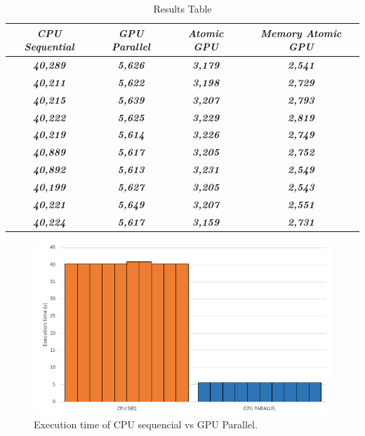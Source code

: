 \documentclass[conference]{IEEEtran}
\begin{document}
\begin{table}[htbp]
	\caption{Results Table} %
	\begin{adjustbox}{width=\columnwidth,center}
		\begin{tabular}{|c|c|c|c|}
		\hline
			\textbf{\textit{CPU Sequential}} & \textbf{\textit{GPU Parallel}} & \textbf{\textit{Atomic GPU}} & \textbf{\textit{Memory Atomic GPU}} \\ \hline
			\textbf{\textit{40,289}} & \textbf{\textit{5,626}} & \textbf{\textit{3,179}} & \textbf{\textit{2,541}} \\ \hline
			\textbf{\textit{40,211}} & \textbf{\textit{5,622}} & \textbf{\textit{3,198}} & \textbf{\textit{2,729}} \\ \hline
			\textbf{\textit{40,215}} & \textbf{\textit{5,639}} & \textbf{\textit{3,207}} & \textbf{\textit{2,793}} \\ \hline
			\textbf{\textit{40,222}} & \textbf{\textit{5,625}} & \textbf{\textit{3,229}} & \textbf{\textit{2,819}} \\ \hline
			\textbf{\textit{40,219}} & \textbf{\textit{5,614}} & \textbf{\textit{3,226}} & \textbf{\textit{2,749}} \\ \hline
			\textbf{\textit{40,889}} & \textbf{\textit{5,617}} & \textbf{\textit{3,205}} & \textbf{\textit{2,752}} \\ \hline
			\textbf{\textit{40,892}} & \textbf{\textit{5,613}} & \textbf{\textit{3,231}} & \textbf{\textit{2,549}} \\ \hline
			\textbf{\textit{40,199}} & \textbf{\textit{5,627}} & \textbf{\textit{3,205}} & \textbf{\textit{2,543}} \\ \hline
			\textbf{\textit{40,221}} & \textbf{\textit{5,649}} & \textbf{\textit{3,207}} & \textbf{\textit{2,551}} \\ \hline
			\textbf{\textit{40,224}} & \textbf{\textit{5,617}} & \textbf{\textit{3,159}} & \textbf{\textit{2,731}} \\ \hline
	\end{tabular}
	\label{tab2}
	\end{adjustbox}
\end{table}
\newpage
\begin{figure}[htbp]
	\centerline{\includegraphics[width=\linewidth]{figures/graph_cpuVSgpupar.png}}
	\caption{Execution time of CPU sequencial vs GPU Parallel.}
	\label{fig1}
\end{figure}
\end{document}
